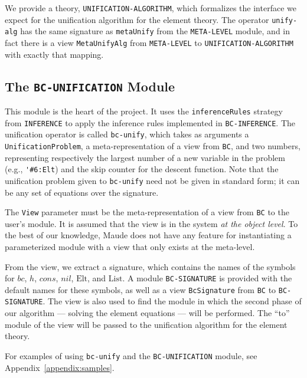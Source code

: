 \documentclass[11pt]{article}
\newcommand{\Elt}{\mathrm{Elt}}
\newcommand{\List}{\mathrm{List}}
\newcommand{\Bc}{\mathit{bc}}
\newcommand{\Hh}{\mathit{h}}
\newcommand{\Cons}{\mathit{cons}}
\newcommand{\Nil}{\mathit{nil}}
\newcommand{\TitleListing}[1]{\texorpdfstring{\lstinline|#1|}{#1}}
\begin{document}
We provide a theory, \lstinline|UNIFICATION-ALGORITHM|, which formalizes the
interface we expect for the unification algorithm for the element theory. The
operator \lstinline|unify-alg| has the same signature as \lstinline|metaUnify|
from the \lstinline|META-LEVEL| module, and in fact there is a view
\lstinline|MetaUnifyAlg| from \lstinline|META-LEVEL| to
\lstinline|UNIFICATION-ALGORITHM| with exactly that mapping.

\subsection{The \TitleListing{BC-UNIFICATION} Module}
\label{subsection:bc-unif-mod}

This module is the heart of the project. It uses the \lstinline|inferenceRules|
strategy from \lstinline|INFERENCE| to apply the inference rules implemented
in \lstinline|BC-INFERENCE|. The unification operator is called
\lstinline|bc-unify|, which takes as arguments a
\lstinline|UnificationProblem|, a meta-representation of a view from
\lstinline|BC|, and two numbers, representing respectively the largest number
of a new variable in the problem (e.g., \lstinline|'#6:Elt|) and the skip
counter for the descent function. Note that the unification problem given
to \lstinline|bc-unify| need not be given in standard form; it can be any set
of equations over the signature.

The \lstinline|View| parameter must be the meta-representation of a view from
\lstinline|BC| to the user's module. It is assumed that the view is in the
system \emph{at the object level}. To the best of our knowledge, Maude does not
have any feature for instantiating a parameterized module with a view that only
exists at the meta-level.

From the view, we extract a signature, which contains the names of the symbols
for $\Bc$, $\Hh$, $\Cons$, $\Nil$, $\Elt$, and $\List$. A module
\lstinline|BC-SIGNATURE| is provided with the default names for these symbols,
as well as a view \lstinline|BcSignature| from \lstinline|BC| to
\lstinline|BC-SIGNATURE|. The view is also used to find the module in which the
second phase of our algorithm --- solving the element equations --- will be
performed. The ``to'' module of the view will be passed to the unification
algorithm for the element theory.

For examples of using \lstinline|bc-unify| and the \lstinline|BC-UNIFICATION|
module, see Appendix~\ref{appendix:samples}.
\end{document}
